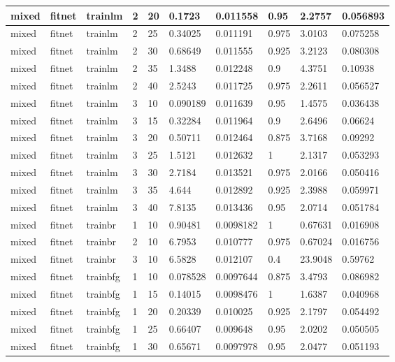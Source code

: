 \begin{longtable}{lllllllll}
mixed & fitnet & trainlm & 2 & 20 & 0.1723 & 0.011558 & 0.95 & 2.2757 & 0.056893 \\ \hline 
mixed & fitnet & trainlm & 2 & 25 & 0.34025 & 0.011191 & 0.975 & 3.0103 & 0.075258 \\ \hline 
mixed & fitnet & trainlm & 2 & 30 & 0.68649 & 0.011555 & 0.925 & 3.2123 & 0.080308 \\ \hline 
mixed & fitnet & trainlm & 2 & 35 & 1.3488 & 0.012248 & 0.9 & 4.3751 & 0.10938 \\ \hline 
mixed & fitnet & trainlm & 2 & 40 & 2.5243 & 0.011725 & 0.975 & 2.2611 & 0.056527 \\ \hline 
mixed & fitnet & trainlm & 3 & 10 & 0.090189 & 0.011639 & 0.95 & 1.4575 & 0.036438 \\ \hline 
mixed & fitnet & trainlm & 3 & 15 & 0.32284 & 0.011964 & 0.9 & 2.6496 & 0.06624 \\ \hline 
mixed & fitnet & trainlm & 3 & 20 & 0.50711 & 0.012464 & 0.875 & 3.7168 & 0.09292 \\ \hline 
mixed & fitnet & trainlm & 3 & 25 & 1.5121 & 0.012632 & 1 & 2.1317 & 0.053293 \\ \hline 
mixed & fitnet & trainlm & 3 & 30 & 2.7184 & 0.013521 & 0.975 & 2.0166 & 0.050416 \\ \hline 
mixed & fitnet & trainlm & 3 & 35 & 4.644 & 0.012892 & 0.925 & 2.3988 & 0.059971 \\ \hline 
mixed & fitnet & trainlm & 3 & 40 & 7.8135 & 0.013436 & 0.95 & 2.0714 & 0.051784 \\ \hline 
mixed & fitnet & trainbr & 1 & 10 & 0.90481 & 0.0098182 & 1 & 0.67631 & 0.016908 \\ \hline 
mixed & fitnet & trainbr & 2 & 10 & 6.7953 & 0.010777 & 0.975 & 0.67024 & 0.016756 \\ \hline 
mixed & fitnet & trainbr & 3 & 10 & 6.5828 & 0.012107 & 0.4 & 23.9048 & 0.59762 \\ \hline 
mixed & fitnet & trainbfg & 1 & 10 & 0.078528 & 0.0097644 & 0.875 & 3.4793 & 0.086982 \\ \hline 
mixed & fitnet & trainbfg & 1 & 15 & 0.14015 & 0.0098476 & 1 & 1.6387 & 0.040968 \\ \hline 
mixed & fitnet & trainbfg & 1 & 20 & 0.20339 & 0.010025 & 0.925 & 2.1797 & 0.054492 \\ \hline 
mixed & fitnet & trainbfg & 1 & 25 & 0.66407 & 0.009648 & 0.95 & 2.0202 & 0.050505 \\ \hline 
mixed & fitnet & trainbfg & 1 & 30 & 0.65671 & 0.0097978 & 0.95 & 2.0477 & 0.051193 \\ \hline 

\end{longtable}

